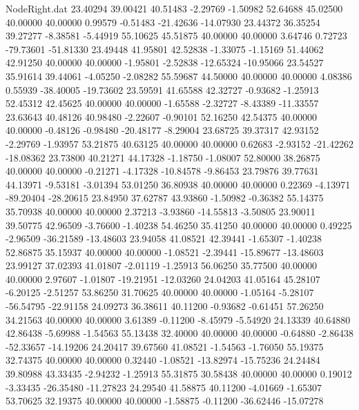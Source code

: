 \begin{filecontents}{NodeRight.dat}
  23.40294   39.00421   40.51483    -2.29769   -1.50982   52.64688   45.02500   40.00000   40.00000    0.99579   -0.51483  -21.42636  -14.07930
  23.44372   36.35254   39.27277    -8.38581   -5.44919   55.10625   45.51875   40.00000   40.00000    3.64746    0.72723  -79.73601  -51.81330
  23.49448   41.95801   42.52838    -1.33075   -1.15169   51.44062   42.91250   40.00000   40.00000   -1.95801   -2.52838  -12.65324  -10.95066
  23.54527   35.91614   39.44061    -4.05250   -2.08282   55.59687   44.50000   40.00000   40.00000    4.08386    0.55939  -38.40005  -19.73602
  23.59591   41.65588   42.32727    -0.93682   -1.25913   52.45312   42.45625   40.00000   40.00000   -1.65588   -2.32727   -8.43389  -11.33557
  23.63643   40.48126   40.98480    -2.22607   -0.90101   52.16250   42.54375   40.00000   40.00000   -0.48126   -0.98480  -20.48177   -8.29004
  23.68725   39.37317   42.93152    -2.29769   -1.93957   53.21875   40.63125   40.00000   40.00000    0.62683   -2.93152  -21.42262  -18.08362
  23.73800   40.21271   44.17328    -1.18750   -1.08007   52.80000   38.26875   40.00000   40.00000   -0.21271   -4.17328  -10.84578   -9.86453
  23.79876   39.77631   44.13971    -9.53181   -3.01394   53.01250   36.80938   40.00000   40.00000    0.22369   -4.13971  -89.20404  -28.20615
  23.84950   37.62787   43.93860    -1.50982   -0.36382   55.14375   35.70938   40.00000   40.00000    2.37213   -3.93860  -14.55813   -3.50805
  23.90011   39.50775   42.96509    -3.76600   -1.40238   54.46250   35.41250   40.00000   40.00000    0.49225   -2.96509  -36.21589  -13.48603
  23.94058   41.08521   42.39441    -1.65307   -1.40238   52.86875   35.15937   40.00000   40.00000   -1.08521   -2.39441  -15.89677  -13.48603
  23.99127   37.02393   41.01807    -2.01119   -1.25913   56.06250   35.77500   40.00000   40.00000    2.97607   -1.01807  -19.21951  -12.03260
  24.04203   41.05164   45.28107    -6.20125   -2.51257   53.86250   31.70625   40.00000   40.00000   -1.05164   -5.28107  -56.54795  -22.91158
  24.09273   36.38611   40.11200    -0.93682   -0.61451   57.26250   34.21563   40.00000   40.00000    3.61389   -0.11200   -8.45979   -5.54920
  24.13339   40.64880   42.86438    -5.69988   -1.54563   55.13438   32.40000   40.00000   40.00000   -0.64880   -2.86438  -52.33657  -14.19206
  24.20417   39.67560   41.08521    -1.54563   -1.76050   55.19375   32.74375   40.00000   40.00000    0.32440   -1.08521  -13.82974  -15.75236
  24.24484   39.80988   43.33435    -2.94232   -1.25913   55.31875   30.58438   40.00000   40.00000    0.19012   -3.33435  -26.35480  -11.27823
  24.29540   41.58875   40.11200    -4.01669   -1.65307   53.70625   32.19375   40.00000   40.00000   -1.58875   -0.11200  -36.62446  -15.07278

\end{filecontents}
